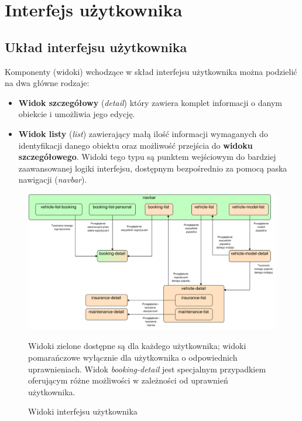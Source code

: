\documentclass[eng,printmode,openany]{mgr}
\begin{document}

\newpage
\section{Interfejs użytkownika}
\subsection{Układ interfejsu użytkownika}
Komponenty (widoki) wchodzące w skład interfejsu użytkownika można podzielić na dwa główne rodzaje:
\begin{itemize}
	\item \textbf{Widok szczegółowy} (\textit{detail}) który zawiera komplet informacji o danym obiekcie i umożliwia jego edycję.
	\item \textbf{Widok listy} (\textit{list}) zawierający małą ilość informacji wymaganych do identyfikacji danego obiektu oraz możliwość przejścia do \textbf{widoku szczegółowego}. Widoki tego typu są punktem wejściowym do bardziej zaawansowanej logiki interfejsu, dostępnym bezpośrednio za pomocą paska nawigacji (\textit{navbar}).
\end{itemize}
\begin{figure}[h]
	\centering
	\includegraphics[scale=0.62]{images/angular_views.png}
	\caption{Widoki interfejsu użytkownika}
	\small 
	Widoki zielone dostępne są dla każdego użytkownika; widoki pomarańczowe wyłącznie dla użytkownika o odpowiednich uprawnieniach. Widok \textit{booking-detail} jest specjalnym przypadkiem oferującym różne możliwości w zależności od uprawnień użytkownika.
\end{figure}
\end{document}
